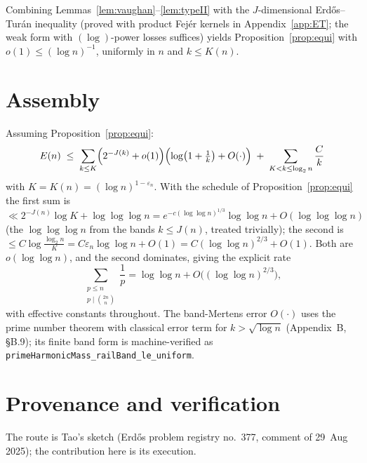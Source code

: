 \documentclass[11pt]{article}
\theoremstyle{definition}
\theoremstyle{plain}
\begin{document}
Combining Lemmas~\ref{lem:vaughan}--\ref{lem:typeII} with the
$J$-dimensional Erd\H{o}s--Tur\'an inequality (proved with product
Fej\'er kernels in Appendix~\ref{app:ET}; the weak form with
$(\log)$-power losses suffices) yields Proposition~\ref{prop:equi} with
$o(1)\le(\log n)^{-1}$, uniformly in $n$ and $k\le K(n)$.

\section{Assembly}\label{sec:assembly}

Assuming Proposition~\ref{prop:equi}:
\[
E(n)\;\le\;
\sum_{k\le K}\Bigl(2^{-J(k)}+o(1)\Bigr)\Bigl(\log\bigl(1+\tfrac1k\bigr)+O(\cdot)\Bigr)
\;+\;\sum_{K<k\le\log_2 n}\frac{C}{k}
\]
with $K=K(n)=(\log n)^{1-\varepsilon_n}$.  With the schedule of
Proposition~\ref{prop:equi} the first sum is
$\ll2^{-J(n)}\log K+\log\log\log n
=e^{-c(\log\log n)^{1/3}}\log\log n+O(\log\log\log n)$
(the $\log\log\log n$ from the bands $k\le J(n)$, treated trivially);
the second is $\le C\log\frac{\log_2 n}{K}=C\varepsilon_n\log\log n
+O(1)=C(\log\log n)^{2/3}+O(1)$.  Both are $o(\log\log n)$, and the
second dominates, giving the explicit rate
\[
\sum_{\substack{p\le n\\ p\mid\binom{2n}{n}}}\frac1p
=\log\log n+O\bigl((\log\log n)^{2/3}\bigr),
\]
with effective constants throughout.  The band-Mertens error $O(\cdot)$ uses the
prime number theorem with classical error term for $k>\sqrt{\log n}$
(Appendix~B, \S B.9); its finite band form is machine-verified as
\texttt{primeHarmonicMass\_railBand\_le\_uniform}.

\section*{Provenance and verification}

The route is Tao's sketch (Erd\H{o}s problem registry no.~377, comment of
29~Aug 2025); the contribution here is its execution.
\end{document}
